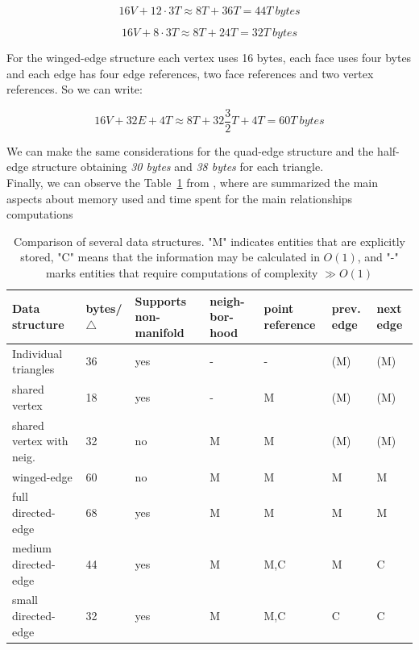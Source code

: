 \begin{equation}
 16V + 12\cdot 3 T \approx 8 T + 36 T = 44 T \: bytes
\end{equation}

\begin{equation}
 16V + 8\cdot 3 T \approx 8 T + 24 T = 32 T \: bytes
\end{equation}

For the winged-edge structure each vertex uses 16 bytes, each face uses four bytes and each edge has four edge references, two face references and two vertex references. So we can write:

\begin{equation}
 16 V + 32 E + 4T \approx 8T + 32 \frac{3}{2}T + 4T = 60T \: bytes
\end{equation}

We can make the same considerations for the quad-edge structure and the half-edge structure obtaining \textit{30 bytes} and \textit{38 bytes} for each triangle.\\

Finally, we can observe the Table~\ref{tbl:meshStructures} from \cite{Campagna}, where are summarized the main aspects about memory used and time spent for the main relationships computations

\begin{table}[htbp]
\centering
\caption[Comparison of several data structures]{Comparison of several data structures. "M" indicates entities that are explicitly stored, "C" means that the information may be calculated in $O(1)$, and "-" marks entities that require computations of complexity $\gg O(1)$}
\label{tbl:meshStructures}
\begin{tabular}{p{3.3cm} || p{1.3cm} | p{1.5cm} | p{1cm} | p{1.2cm} | p{0.8cm} | p{0.8cm}}
\toprule
\textbf{Data structure}	& \textbf{bytes/$\bigtriangleup$}	&\textbf{Supports non-manifold}	&\textbf{neigh-bor-hood}	&\textbf{point reference}	&\textbf{prev. edge}	&\textbf{next edge}\\ \midrule \midrule
Individual triangles              & 36	& yes	&-	&-	&(M)	&(M)\\ \midrule
shared vertex              & 18	& yes	&-	&M	&(M)	&(M)\\ \midrule \midrule
shared vertex with neig.              & 32	& no	&M	&M	&(M)	&(M)\\ \midrule
winged-edge              & 60	& no	&M	&M	&M	&M\\ \midrule \midrule
full directed-edge              & 68	& yes	&M	&M	&M	&M\\ \midrule
medium directed-edge              & 44	& yes	&M	&M,C	&M	&C\\ \midrule
small directed-edge              & 32	& yes	&M	&M,C	&C	&C\\
\bottomrule
\end{tabular}
\end{table}

